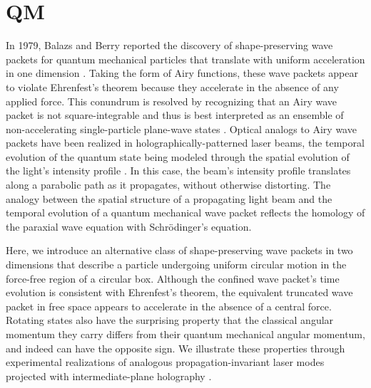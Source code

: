 \section{QM}


In 1979, Balazs and Berry reported the discovery of
shape-preserving wave packets for quantum mechanical particles
that translate with uniform
acceleration in one dimension \cite{balazs79}.
Taking the form of Airy functions, these wave packets
appear to violate Ehrenfest's theorem because
they accelerate in the absence of any applied force.
This conundrum is resolved by recognizing that an
Airy wave packet is not
square-integrable and thus is best interpreted as an 
ensemble of non-accelerating single-particle plane-wave states \cite{balazs79,ballentine94}.
Optical analogs to Airy wave packets
have been realized in holographically-patterned laser beams,
the temporal evolution of the quantum state being modeled through
the spatial evolution of the light's intensity profile
\cite{siviloglou07,siviloglou07a,kaminer12}.
In this case, the beam's intensity profile translates
along a parabolic path as it propagates, without
otherwise distorting.
The analogy between the spatial structure of a propagating
light beam and the temporal evolution of a quantum
mechanical wave packet reflects the homology of 
the paraxial wave equation with Schr\"odinger's equation.

Here, we introduce an alternative class of shape-preserving wave
packets in two dimensions that describe a particle undergoing
uniform circular motion
in the force-free region of a circular box.
Although the confined wave packet's time evolution is consistent with
Ehrenfest's theorem, the equivalent truncated wave packet in free
space appears to accelerate in the absence of a central force.
Rotating states also have the surprising property that
the classical angular momentum they carry
differs from their quantum mechanical angular momentum,
and indeed can have the opposite sign.
We illustrate these properties through experimental realizations
of analogous propagation-invariant laser modes projected
with intermediate-plane
holography \cite{mondal18}.

